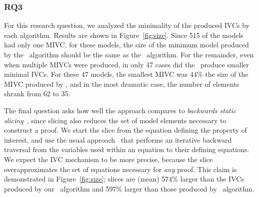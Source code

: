 \subsubsection{RQ3}
For this research question, we analyzed the minimality of the produced IVCs by each algorithm.  Results are shown in Figure~\ref{fig:size}.  Since 515 of the models had only one MIVC, for these models, the size of the minimum model produced by the \aivcalg\ algorithm should be the same as the \ucbfalg\ algorithm.  For the remainder, even when multiple MIVCs were produced, in only 47 cases did the \aivcalg\ produce smaller minimal IVCs.  For these 47 models, the smallest MIVC was 44\% the size of the MIVC produced by \ucbfalg, and in the most dramatic case, the number of elements shrank from 62 to 35. %

The final question asks how well the approach compares to {\em backwards static slicing}~\cite{Tip95asurvey}, since slicing also reduces the set of model elements necessary to construct a proof.  We start the slice from the equation defining the property of interest, and use the usual approach~\cite{Gaucher03:slicing} that performs an iterative backward traversal from the variables used within an equation to their defining equations.  We expect the IVC mechanism to be more precise, because the slice overapproximates the set of equations necessary for {\em any} proof.  This claim is demonstrated in Figure~\ref{fig:size}; slices are (mean) 574\% larger than the IVCs produced by our \ucalg\ algorithm and 597\% larger than those produced by \ucbfalg\ algorithm.




